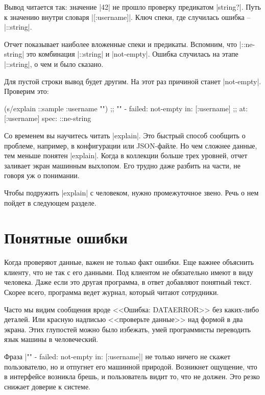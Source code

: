 Вывод читается так: значение \spverb|42| не прошло проверку предикатом
\spverb|string?|. Путь к значению внутри словаря \spverb|[:username]|.
Ключ спеки, где случилась ошибка -- \spverb|::string|.

Отчет показывает наиболее вложенные спеки и предикаты. Вспомним, что
\spverb|::ne-string| это комбинация \spverb|::string| и
\spverb|not-empty|. Ошибка случилась на этапе \spverb|::string|, о чем и было
сказано.

Для пустой строки вывод будет другим. На этот раз причиной станет
\spverb|not-empty|. Проверим это:

\begin{english}
  \begin{clojure}
(s/explain ::sample {:username ""})
;; "" - failed: not-empty in: [:username]
;; at: [:username] spec: ::ne-string
  \end{clojure}
\end{english}

Со временем вы научитесь читать \spverb|explain|. Это быстрый способ сообщить о
проблеме, например, в конфигурации или JSON-файле. Но чем сложнее данные, тем
меньше понятен \spverb|explain|. Когда в коллекции больше трех уровней, отчет
заливает экран машинным выхлопом. Его трудно даже разбить на части, не говоря уж
о понимании.

Чтобы подружить \spverb|explain| с человеком, нужно промежуточное звено. Речь о
нем пойдет в следующем разделе.

\section{Понятные ошибки}

Когда проверяют данные, важен не только факт ошибки. Еще важнее объяснить
клиенту, что не так с его данными. Под клиентом не обязательно имеют в виду
человека. Даже если это другая программа, в ответ добавляют понятный
текст. Скорее всего, программа ведет журнал, который читают сотрудники.

Часто мы видим сообщения вроде <<Ошибка: DATAERROR>> без каких-либо деталей. Или
красную надписью <<проверьте данные>> над формой в два экрана. Этих глупостей
можно было избежать, умей программисты переводить язык машины в человеческий.

Фраза \spverb|"" - failed: not-empty in: [:username]| не только ничего не скажет
пользователю, но и отпугнет его машинной природой. Возникнет ощущение, что в
интерфейсе возникла брешь, и пользователь видит то, что не должен. Это резко
снижает доверие к системе.

